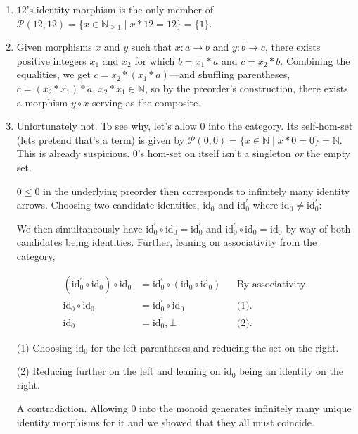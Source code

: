\documentclass{article}
\begin{document}
\begin{enumerate}[label=(\alph*)]

\item $12$’s identity morphism is the only member of $\mathcal{P}(12, 12) = \{x \in \mathbb{N}_{\geq 1} \mid x * 12 = 12\} = \{1\}$.

\item Given morphisms $x$ and $y$ such that $x: a \rightarrow b$ and $y: b \rightarrow c$, there exists positive integers $x_{1}$ and $x_{2}$ for which $b = x_{1} * a$ and $c = x_{2} * b$. Combining the equalities, we get $c = x_{2} * (x_{1} * a)$—and shuffling parentheses, $c = (x_{2} * {x_1}) * a$. $x_{2} * {x_1} \in \mathbb{N}$, so by the preorder’s construction, there exists a morphism $y \circ x$ serving as the composite.

\item Unfortunately not. To see why, let’s allow $0$ into the category. Its self-hom-set (lets pretend that’s a term) is given by $\mathcal{P}(0, 0) = \{x \in \mathbb{N} \mid x * 0 = 0\} = \mathbb{N}$. This is already suspicious. $0$’s hom-set on itself isn’t a singleton \emph{or} the empty set.

$0 \leq 0$ in the underlying preorder then corresponds to infinitely many identity arrows. Choosing two candidate identities, $\textrm{id}_{0}$ and $\textrm{id}_{0}^\prime$ where $\textrm{id}_{0} \neq \textrm{id}_{0}^\prime$:

We then simultaneously have $\textrm{id}_{0}^\prime \circ \textrm{id}_{0} = \textrm{id}_{0}^\prime$ and $\textrm{id}_{0}^\prime \circ \textrm{id}_{0} = \textrm{id}_{0}$ by way of both candidates being identities. Further, leaning on associativity from the category,

\begin{align*}
    (\textrm{id}_{0}^\prime \circ \textrm{id}_{0}) \circ \textrm{id}_{0} &= \textrm{id}_{0}^\prime \circ (\textrm{id}_{0} \circ \textrm{id}_{0}) && \text{By associativity.} \\
    \textrm{id}_{0} \circ \textrm{id}_{0} &= \textrm{id}_{0}^\prime \circ \textrm{id}_{0} && \text{(1).} \\
    \textrm{id}_{0} &= \textrm{id}_{0}^\prime, \bot && \text{(2).}
\end{align*}

(1) Choosing $\textrm{id}_{0}$ for the left parentheses and reducing the set on the right.

(2) Reducing further on the left and leaning on  $\textrm{id}_{0}$ being an identity on the right.

A contradiction. Allowing $0$ into the monoid generates infinitely many unique identity morphisms for it and we showed that they all must coincide.

\end{enumerate}
\end{document}
